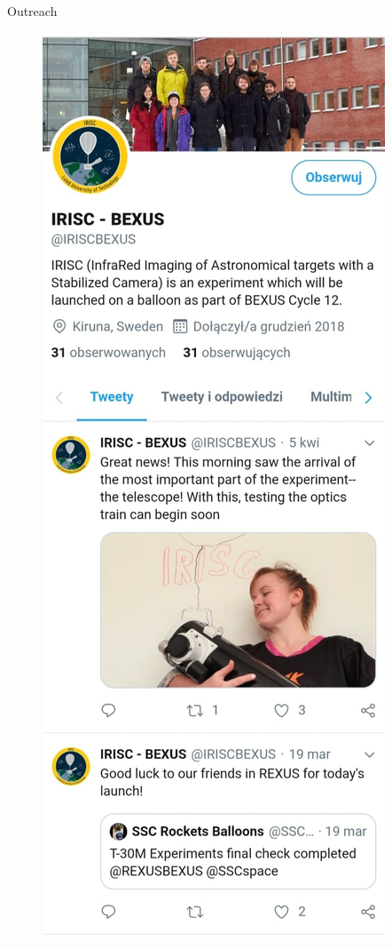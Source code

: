 \documentclass[11pt, aspectratio=169]{beamer}
\begin{document}
\begin{frame}[c]{Outreach}
    \begin{minipage}[c]{0.25\linewidth}
        \begin{figure}[]
            \centering
            \includegraphics[height=0.9\textheight]{images/twitter.jpg}
            \label{}
        \end{figure}
    \end{minipage}
\end{frame}
\end{document}
